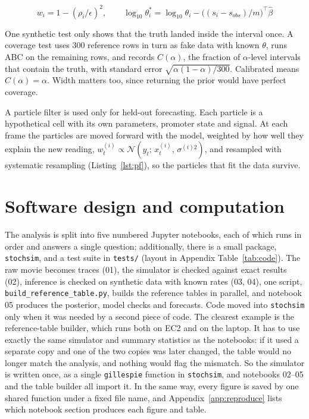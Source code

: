 \begin{equation}
w_i = 1 - (\rho_i/\epsilon)^2, \qquad
\log_{10}\theta_i^{*} = \log_{10}\theta_i - \big((s_i - s_{obs})/m\big)^\top \hat\beta
\label{eq:regadj}
\end{equation}

One synthetic test only shows that the truth landed inside the interval once. A coverage test \cite{prangle2014} uses 300 reference rows in turn as fake data with known $\theta$, runs ABC on the remaining rows, and records $\widehat{C}(\alpha)$, the fraction of $\alpha$-level intervals that contain the truth, with standard error $\sqrt{\alpha(1-\alpha)/300}$. Calibrated means $\widehat{C}(\alpha) = \alpha$. Width matters too, since returning the prior would have perfect coverage.

A particle filter \cite{wilkinson2019} is used only for held-out forecasting. Each particle is a hypothetical cell with its own parameters, promoter state and signal. At each frame the particles are moved forward with the model, weighted by how well they explain the new reading, $w_t^{(i)} \propto \mathcal{N}(y_t;\, x_t^{(i)},\, \sigma^{(i)2})$, and resampled with systematic resampling (Listing~\ref{lst:pf}), so the particles that fit the data survive.

\section{Software design and computation}\label{sec:computing}

The analysis is split into five numbered Jupyter notebooks, each of which runs in order and answers a single question; additionally, there is a small package, \texttt{stochsim}, and a test suite in \texttt{tests/} (layout in Appendix Table~\ref{tab:code}). The raw movie becomes traces (01), the simulator is checked against exact results (02), inference is checked on synthetic data with known rates (03, 04), one script, \texttt{build\_reference\_table.py}, builds the reference tables in parallel, and notebook 05 produces the posterior, model checks and forecasts. Code moved into \texttt{stochsim} only when it was needed by a second piece of code. The clearest example is the reference-table builder, which runs both on EC2 and on the laptop. It has to use exactly the same simulator and summary statistics as the notebooks: if it used a separate copy and one of the two copies was later changed, the table would no longer match the analysis, and nothing would flag the mismatch. So the simulator is written once, as a single \texttt{gillespie} function in \texttt{stochsim}, and notebooks 02--05 and the table builder all import it. In the same way, every figure is saved by one shared function under a fixed file name, and Appendix~\ref{app:reproduce} lists which notebook section produces each figure and table.

